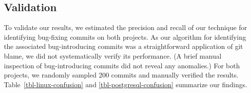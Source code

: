 


\subsection{Validation} 
\label{sec-validation}







To validate our results, we estimated the precision and recall of our technique
for identifying bug-fixing commits on both projects. As our algorithm for
identifying the associated bug-introducing commits was a straightforward
application of git blame, we did not systematically verify its performance. (A
brief manual inspection of bug-introducing commits did not reveal any
anomalies.) For both projects, we randomly sampled 200 commits and manually
verified the results. Table~\ref{tbl-linux-confusion} and
\ref{tbl-postgresql-confusion} summarize our findings.

